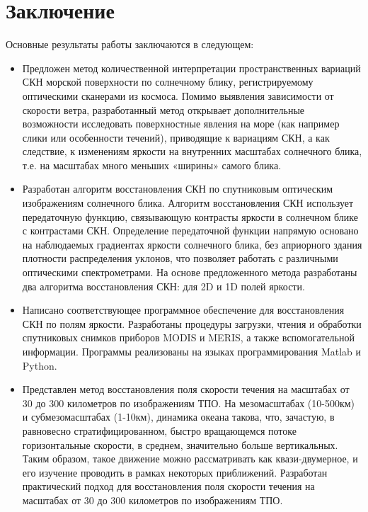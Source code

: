 \chapter*{Заключение}						%

Основные результаты работы заключаются в следующем:

\begin{itemize}

\item Предложен метод количественной интерпретации пространственных вариаций СКН морской поверхности по солнечному блику, регистрируемому оптическими сканерами из космоса. Помимо выявления зависимости от скорости ветра, разработанный метод открывает дополнительные возможности исследовать поверхностные явления на море (как например слики или особенности течений), приводящие к вариациям СКН, а как следствие, к изменениям яркости на внутренних масштабах солнечного блика, т.е. на масштабах много меньших «ширины» самого блика.

\item Разработан алгоритм восстановления СКН по спутниковым оптическим изображениям солнечного блика. Алгоритм восстановления СКН использует передаточную функцию, связывающую контрасты яркости в солнечном блике с контрастами СКН. Определение передаточной функции напрямую основано на наблюдаемых градиентах яркости солнечного блика, без априорного здания плотности распределения уклонов, что позволяет работать с различными оптическими спектрометрами. На основе предложенного метода разработаны два алгоритма восстановления СКН: для 2D и 1D полей яркости.

\item Написано соответствующее программное обеспечение для восстановления СКН по полям яркости. Разработаны процедуры загрузки, чтения и обработки спутниковых снимков приборов MODIS и MERIS, а также вспомогательной информации. Программы реализованы на языках программирования Matlab и Python.

\item Представлен метод восстановления поля скорости течения на масштабах от 30 до 300 километров по изображениям ТПО. На мезомасштабах (10-500км) и субмезомасштабах (1-10км), динамика океана такова, что, зачастую, в равновесно стратифицированном, быстро вращающемся потоке горизонтальные скорости, в среднем, значительно больше вертикальных. Таким образом, такое движение можно рассматривать как квази-двумерное, и его изучение проводить в рамках некоторых приближений. Разработан практический подход для восстановления поля скорости течения на масштабах от 30 до 300 километров по изображениям ТПО.


\end{itemize}
